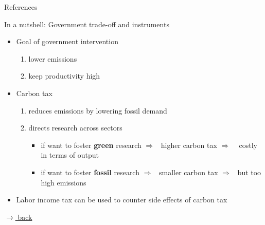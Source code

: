 \documentclass[11pt,aspectratio=169]{beamer}
\newcommand{\ar}{$\Rightarrow$ \ }
\begin{document}
%

\begin{frame}[shrink]{References}
	
	
	
\end{frame}



\appendix

%




\begin{frame}{In a nutshell: Government trade-off and instruments}
	\hypertarget{govProb}{}
	\begin{itemize}
		\item 	Goal of government intervention
		\begin{enumerate}
			\item[a)] lower emissions
			\item[b)] keep productivity high
		\end{enumerate}
		\vspace{3mm}
		\item Carbon tax
		\begin{enumerate}
			\item[a)] reduces emissions by lowering fossil demand
			\item[b)] directs research across sectors
			\begin{itemize}
				\item[-] if want to foster \textbf{green} research
				\ar higher carbon tax \ar %
				costly in terms of output %
				\item[-] if want to foster \textbf{fossil} research \ar smaller carbon tax \ar but too high emissions
			\end{itemize}
		\end{enumerate}
		\item Labor income tax can be used to counter side effects of carbon tax 
	\end{itemize}
	
	\vspace{5mm}
	\hfill	\hyperlink{calback}{\tiny{$\rightarrow$ back}}
\end{frame}
\end{document}
